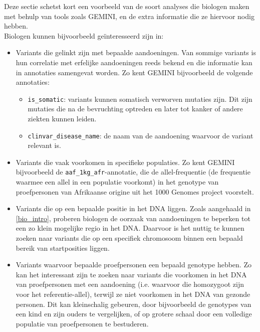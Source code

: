 Deze sectie schetst kort een voorbeeld van de soort analyses die biologen maken met behulp van tools zoals GEMINI, en de extra informatie die ze hiervoor nodig hebben.\\
Biologen kunnen bijvoorbeeld ge\"interesseerd zijn in:
\begin{itemize}
\item Variants die gelinkt zijn met bepaalde aandoeningen. Van sommige variants is hun correlatie met erfelijke aandoeningen reeds bekend en die informatie kan in annotaties samengevat worden. Zo kent GEMINI bijvoorbeeld de volgende annotaties:
\begin{itemize}
\item \texttt{is\_somatic}: variants kunnen somatisch verworven mutaties zijn. Dit zijn mutaties die na de bevruchting optreden en later tot kanker of andere ziekten kunnen leiden.
\item \texttt{clinvar\_disease\_name}: de naam van de aandoening waarvoor de variant relevant is.
\end{itemize}
\item Variants die vaak voorkomen in specifieke populaties. Zo kent GEMINI bijvoorbeeld de \texttt{aaf\_1kg\_afr}-annotatie, die de allel-frequentie (de frequentie waarmee een allel in een populatie voorkomt) in het genotype van proefpersonen van Afrikaanse origine uit het 1000 Genomes project voorstelt.
\item Variants die op een bepaalde positie in het DNA liggen. Zoals aangehaald in \ref{bio_intro}, proberen biologen de oorzaak van aandoeningen te beperken tot een zo klein mogelijke regio in het DNA. Daarvoor is het nuttig te kunnen zoeken naar variants die op een specifiek chromosoom binnen een bepaald bereik van startposities liggen.
\item Variants waarvoor bepaalde proefpersonen een bepaald genotype hebben. Zo kan het interessant zijn te zoeken naar variants die voorkomen in het DNA van proefpersonen met een aandoening (i.e. waarvoor die homozygoot zijn voor het referentie-allel), terwijl ze niet voorkomen in het DNA van gezonde personen. Dit kan kleinschalig gebeuren, door bijvoorbeeld de genotypes van een kind en zijn ouders te vergelijken, of op grotere schaal door een volledige populatie van proefpersonen te bestuderen.
\end{itemize}